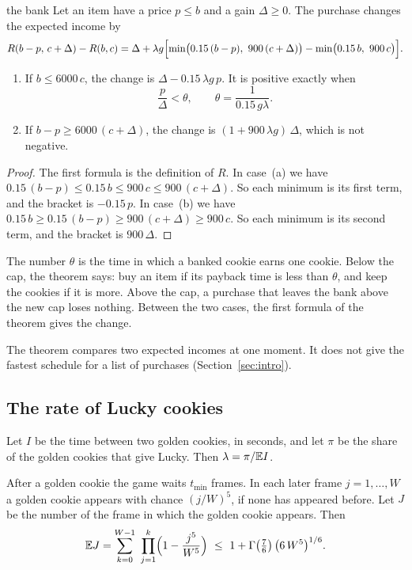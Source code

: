 \documentclass[11pt]{article}
\theoremstyle{boxed}
\begin{document}
\begin{maintheorem}{the bank}\label{thm:bank}
Let an item have a price $p\le b$ and a gain $\Delta\ge0$. The purchase changes the expected
income by
\[
  R(b-p,\,c+\Delta)-R(b,c)=\Delta+\lambda g\Bigl[\min\bigl(0.15\,(b-p),\ 900\,(c+\Delta)\bigr)
  -\min\bigl(0.15\,b,\ 900\,c\bigr)\Bigr].
\]
\begin{enumerate}[leftmargin=1.9em,label=\textup{(\alph*)}]
\item If $b\le6000\,c$, the change is $\Delta-0.15\,\lambda g\,p$. It is positive exactly when
\[
  \frac{p}{\Delta}<\theta,\qquad\theta=\frac{1}{0.15\,g\lambda}.
\]
\item If $b-p\ge6000\,(c+\Delta)$, the change is $(1+900\,\lambda g)\,\Delta$, which is not
negative.
\end{enumerate}
\end{maintheorem}

\begin{proof}
The first formula is the definition of $R$. In case~(a) we have
$0.15\,(b-p)\le0.15\,b\le900\,c\le900\,(c+\Delta)$. So each minimum is its first term, and the
bracket is $-0.15\,p$. In case~(b) we have $0.15\,b\ge0.15\,(b-p)\ge900\,(c+\Delta)\ge900\,c$.
So each minimum is its second term, and the bracket is $900\,\Delta$.
\end{proof}

The number $\theta$ is the time in which a banked cookie earns one cookie. Below the cap, the
theorem says: buy an item if its payback time is less than $\theta$, and keep the cookies if it
is more. Above the cap, a purchase that leaves the bank above the new cap loses nothing. Between
the two cases, the first formula of the theorem gives the change.

The theorem compares two expected incomes at one moment. It does not give the fastest schedule
for a list of purchases (Section~\ref{sec:intro}).

\subsection{The rate of Lucky cookies}

Let $I$ be the time between two golden cookies, in seconds, and let $\pi$ be the share of the
golden cookies that give Lucky. Then $\lambda=\pi/\mathbb{E} I$.

\begin{lemma}\label{lem:interval}
After a golden cookie the game waits $t_{\min}$ frames. In each later frame $j=1,\dots,W$ a
golden cookie appears with chance $(j/W)^{5}$, if none has appeared before. Let $J$ be the
number of the frame in which the golden cookie appears. Then
\[
  \EE J=\sum_{k=0}^{W-1}\ \prod_{j=1}^{k}\Bigl(1-\frac{j^{5}}{W^{5}}\Bigr)
  \ \le\ 1+\Gamma\bigl(\tfrac76\bigr)\,\bigl(6\,W^{5}\bigr)^{1/6}.
\]
\end{lemma}
\end{document}
